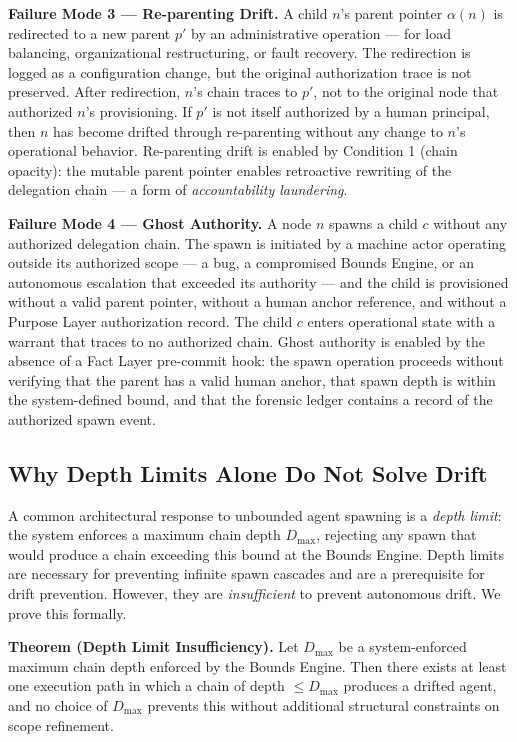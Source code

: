 \medskip
\noindent\textbf{Failure Mode 3 — Re-parenting Drift.}
A child $n$'s parent pointer $\alpha(n)$ is redirected to a new parent $p'$ by an administrative operation — for load balancing, organizational restructuring, or fault recovery. The redirection is logged as a configuration change, but the original authorization trace is not preserved. After redirection, $n$'s chain traces to $p'$, not to the original node that authorized $n$'s provisioning. If $p'$ is not itself authorized by a human principal, then $n$ has become drifted through re-parenting without any change to $n$'s operational behavior. Re-parenting drift is enabled by Condition 1 (chain opacity): the mutable parent pointer enables retroactive rewriting of the delegation chain — a form of \emph{accountability laundering}.

\medskip
\noindent\textbf{Failure Mode 4 — Ghost Authority.}
A node $n$ spawns a child $c$ without any authorized delegation chain. The spawn is initiated by a machine actor operating outside its authorized scope — a bug, a compromised Bounds Engine, or an autonomous escalation that exceeded its authority — and the child is provisioned without a valid parent pointer, without a human anchor reference, and without a Purpose Layer authorization record. The child $c$ enters operational state with a warrant that traces to no authorized chain. Ghost authority is enabled by the absence of a Fact Layer pre-commit hook: the spawn operation proceeds without verifying that the parent has a valid human anchor, that spawn depth is within the system-defined bound, and that the forensic ledger contains a record of the authorized spawn event.

\subsection{Why Depth Limits Alone Do Not Solve Drift}
\label{sec:rs-drift-depth-limits}

A common architectural response to unbounded agent spawning is a \emph{depth limit}: the system enforces a maximum chain depth $D_{\max}$, rejecting any spawn that would produce a chain exceeding this bound at the Bounds Engine. Depth limits are necessary for preventing infinite spawn cascades and are a prerequisite for drift prevention. However, they are \emph{insufficient} to prevent autonomous drift. We prove this formally.

\medskip
\noindent\textbf{Theorem (Depth Limit Insufficiency).}
Let $D_{\max}$ be a system-enforced maximum chain depth enforced by the Bounds Engine. Then there exists at least one execution path in which a chain of depth $\leq D_{\max}$ produces a drifted agent, and no choice of $D_{\max}$ prevents this without additional structural constraints on scope refinement.

